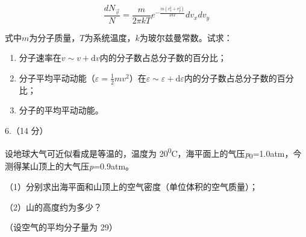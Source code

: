 \documentclass[fontset=exam]{exam-zh}
\begin{document}
\[\frac{dN_{\overset{\rightarrow}{v}}}{N} = \frac{m}{2\pi kT}e^{- \frac{m(v_{x}^{2} + v_{y}^{2})}{2kT}}dv_{x}dv_{y}\]

式中\(m\)为分子质量，\(T\)为系统温度，\(k\)为玻尔兹曼常数。试求：

\begin{enumerate}
\def\labelenumi{\arabic{enumi}.}
\item
  分子速率在\(\left. v \right.\sim v + \text{d}v\)内的分子数占总分子数的百分比；
\item
  分子平均平动动能（\(\varepsilon = \frac{1}{2}mv^{2}\)）在\(\left. \varepsilon \right.\sim\varepsilon + \text{d}\varepsilon\)内的分子数占总分子数的百分比；
\item
  分子的平均平动动能。
\end{enumerate}

6.（14 分）

设地球大气可近似看成是等温的，温度为 20\textsuperscript{0}C，海平面上的气压\emph{p}\textsubscript{0}=1.0atm，今测得某山顶上的大气压\emph{p}=0.9atm。

（1）分别求出海平面和山顶上的空气密度（单位体积的空气质量）；

（2）山的高度约为多少？

（设空气的平均分子量为 29）
\end{document}
